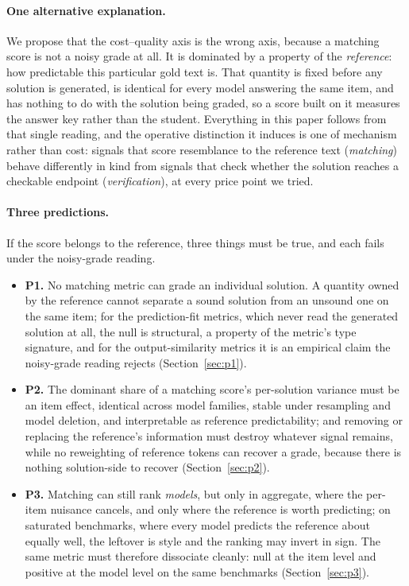 \documentclass[11pt]{article}
\begin{document}
\paragraph{One alternative explanation.}
We propose that the cost--quality axis is the wrong axis, because a matching score is not a noisy grade at all.
It is dominated by a property of the \emph{reference}: how predictable this particular gold text is.
That quantity is fixed before any solution is generated, is identical for every model answering the same item, and has nothing to do with the solution being graded, so a score built on it measures the answer key rather than the student.
Everything in this paper follows from that single reading, and the operative distinction it induces is one of mechanism rather than cost: signals that score resemblance to the reference text (\emph{matching}) behave differently in kind from signals that check whether the solution reaches a checkable endpoint (\emph{verification}), at every price point we tried.

\paragraph{Three predictions.}
If the score belongs to the reference, three things must be true, and each fails under the noisy-grade reading.
\begin{itemize}
\item \textbf{P1.} No matching metric can grade an individual solution. A quantity owned by the reference cannot separate a sound solution from an unsound one on the same item; for the prediction-fit metrics, which never read the generated solution at all, the null is structural, a property of the metric's type signature, and for the output-similarity metrics it is an empirical claim the noisy-grade reading rejects (Section~\ref{sec:p1}).
\item \textbf{P2.} The dominant share of a matching score's per-solution variance must be an item effect, identical across model families, stable under resampling and model deletion, and interpretable as reference predictability; and removing or replacing the reference's information must destroy whatever signal remains, while no reweighting of reference tokens can recover a grade, because there is nothing solution-side to recover (Section~\ref{sec:p2}).
\item \textbf{P3.} Matching can still rank \emph{models}, but only in aggregate, where the per-item nuisance cancels, and only where the reference is worth predicting; on saturated benchmarks, where every model predicts the reference about equally well, the leftover is style and the ranking may invert in sign. The same metric must therefore dissociate cleanly: null at the item level and positive at the model level on the same benchmarks (Section~\ref{sec:p3}).
\end{itemize}
\end{document}
